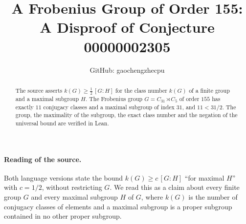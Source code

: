 \documentclass[11pt]{article}
\title{A Frobenius Group of Order 155:\\A Disproof of Conjecture 00000002305}
\author{GitHub: gaochengzhecpu}
\date{}
\theoremstyle{remark}
\begin{document}
\maketitle
\begin{abstract}
The source asserts $k(G)\ge\tfrac12\,[G:H]$ for the class number $k(G)$ of
a finite group and a maximal subgroup $H$. The Frobenius group
$G=C_{31}\rtimes C_5$ of order $155$ has exactly $11$ conjugacy classes
and a maximal subgroup of index $31$, and $11<31/2$. The group, the
maximality of the subgroup, the exact class number and the negation of
the universal bound are verified in Lean.
\end{abstract}

\paragraph{Reading of the source.}
Both language versions state the bound $k(G)\ge c\,[G:H]$ ``for maximal
$H$'' with $c=1/2$, without restricting $G$. We read this as a claim
about every finite group $G$ and every maximal subgroup $H$ of $G$,
where $k(G)$ is the number of conjugacy classes of elements and a
maximal subgroup is a proper subgroup contained in no other proper
subgroup.
\end{document}
